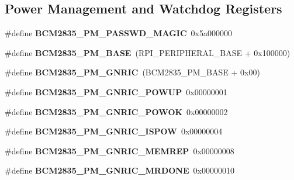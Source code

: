 \subsection*{Power Management and Watchdog Registers}
\begin{DoxyCompactItemize}
\item 
\mbox{\label{group__raspberrypi__reg_ga47152e5f71f3bfc44c8bb603c3d83229}} 
\#define {\bfseries B\+C\+M2835\+\_\+\+P\+M\+\_\+\+P\+A\+S\+S\+W\+D\+\_\+\+M\+A\+G\+IC}~0x5a000000
\item 
\mbox{\label{group__raspberrypi__reg_ga810ec454109b9080de7846f07e46cc54}} 
\#define {\bfseries B\+C\+M2835\+\_\+\+P\+M\+\_\+\+B\+A\+SE}~(R\+P\+I\+\_\+\+P\+E\+R\+I\+P\+H\+E\+R\+A\+L\+\_\+\+B\+A\+SE + 0x100000)
\item 
\mbox{\label{group__raspberrypi__reg_ga042d72a2ecb027e42a03fe518a7360f7}} 
\#define {\bfseries B\+C\+M2835\+\_\+\+P\+M\+\_\+\+G\+N\+R\+IC}~(B\+C\+M2835\+\_\+\+P\+M\+\_\+\+B\+A\+SE + 0x00)
\item 
\mbox{\label{group__raspberrypi__reg_ga91378a7735bbd82006b6cf1569104b0a}} 
\#define {\bfseries B\+C\+M2835\+\_\+\+P\+M\+\_\+\+G\+N\+R\+I\+C\+\_\+\+P\+O\+W\+UP}~0x00000001
\item 
\mbox{\label{group__raspberrypi__reg_gad2042ea823e038aa2a37643d7488890d}} 
\#define {\bfseries B\+C\+M2835\+\_\+\+P\+M\+\_\+\+G\+N\+R\+I\+C\+\_\+\+P\+O\+W\+OK}~0x00000002
\item 
\mbox{\label{group__raspberrypi__reg_gacf28c9c55d99363ef62549a06dc57a0c}} 
\#define {\bfseries B\+C\+M2835\+\_\+\+P\+M\+\_\+\+G\+N\+R\+I\+C\+\_\+\+I\+S\+P\+OW}~0x00000004
\item 
\mbox{\label{group__raspberrypi__reg_gaf03d1242ffff518cdefdce069e3ba5d6}} 
\#define {\bfseries B\+C\+M2835\+\_\+\+P\+M\+\_\+\+G\+N\+R\+I\+C\+\_\+\+M\+E\+M\+R\+EP}~0x00000008
\item 
\mbox{\label{group__raspberrypi__reg_gaa8529515e6d221f8edef49b6c599d9e8}} 
\#define {\bfseries B\+C\+M2835\+\_\+\+P\+M\+\_\+\+G\+N\+R\+I\+C\+\_\+\+M\+R\+D\+O\+NE}~0x00000010

\end{DoxyCompactItemize}
